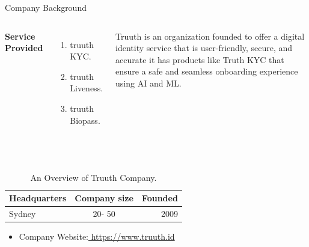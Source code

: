 \documentclass[aspectratio=169,xcolor=dvipsnames]{beamer}
\begin{document}
\begin{frame}{Company Background}
    \tableofcontents

    \begin{columns}[c] %

        \textbf{Service Provided}
        \begin{enumerate}
            \item truuth KYC.
            \item truuth Liveness.
            \item truuth Biopass.
        \end{enumerate}

         Truuth is an organization founded to offer a digital identity service that is user-friendly, secure, and accurate it has products like Truth KYC that ensure a safe and seamless onboarding experience using AI and ML.

    \end{columns}   \\
    
\begin{table}[h!]
  \begin{center}
    \caption{An Overview of Truuth Company.}
    \label{tab:table1}
    \begin{tabular}{|l|c|r|} %
      \hline
      \textbf{Headquarters } & \textbf{Company size} & \textbf{Founded}\\
      
      \hline
      Sydney & 20- 50  & 2009 \\
      \hline
     
    \end{tabular}
  \end{center}
\end{table}   \newline
\begin{itemize}
      
    \item \alert{Company Website:}\href{ https://www.truuth.id/}{ https://www.truuth.id}
 
    \end{itemize}
\end{frame}
\end{document}
